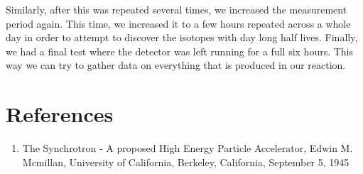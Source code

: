 \documentclass{article}
\begin{document}
Similarly, after this was repeated several times, we increased the measurement period again. This time, we increased it to a few hours repeated across a whole day in order to attempt to discover the isotopes with day long half lives. Finally, we had a final test where the detector was left running for a full six hours. This way we can try to gather data on everything that is produced in our reaction. 
\section{References}
\begin{enumerate}
\item The Synchrotron - A proposed High Energy Particle Accelerator, Edwin M. Mcmillan, University of California, Berkeley, California, September 5, 1945 \label{ref:1}
\end{enumerate}
\end{document}
